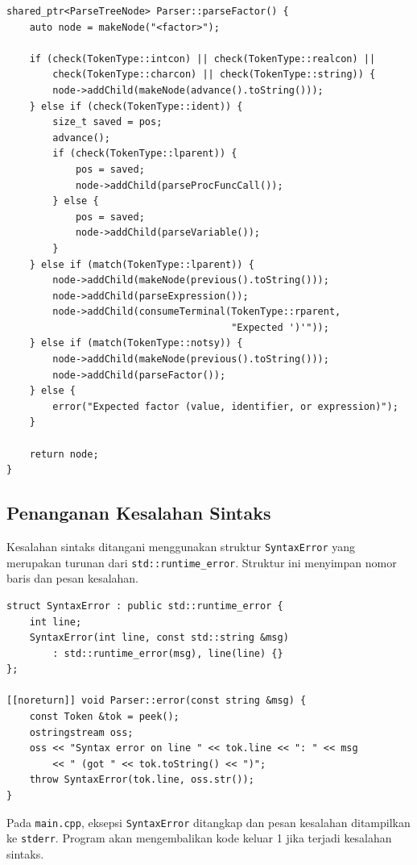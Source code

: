 \documentclass[12pt,a4paper]{article}
\begin{document}
\begin{lstlisting}[style=cpp, caption={Disambiguasi factor: variable vs function call}]
shared_ptr<ParseTreeNode> Parser::parseFactor() {
    auto node = makeNode("<factor>");

    if (check(TokenType::intcon) || check(TokenType::realcon) ||
        check(TokenType::charcon) || check(TokenType::string)) {
        node->addChild(makeNode(advance().toString()));
    } else if (check(TokenType::ident)) {
        size_t saved = pos;
        advance();
        if (check(TokenType::lparent)) {
            pos = saved;
            node->addChild(parseProcFuncCall());
        } else {
            pos = saved;
            node->addChild(parseVariable());
        }
    } else if (match(TokenType::lparent)) {
        node->addChild(makeNode(previous().toString()));
        node->addChild(parseExpression());
        node->addChild(consumeTerminal(TokenType::rparent,
                                       "Expected ')'"));
    } else if (match(TokenType::notsy)) {
        node->addChild(makeNode(previous().toString()));
        node->addChild(parseFactor());
    } else {
        error("Expected factor (value, identifier, or expression)");
    }

    return node;
}
\end{lstlisting}

\subsection{Penanganan Kesalahan Sintaks}

Kesalahan sintaks ditangani menggunakan struktur \texttt{SyntaxError} yang merupakan turunan dari \texttt{std::runtime\_error}. Struktur ini menyimpan nomor baris dan pesan kesalahan.

\begin{lstlisting}[style=cpp, caption={Struktur SyntaxError dan fungsi error}]
struct SyntaxError : public std::runtime_error {
    int line;
    SyntaxError(int line, const std::string &msg)
        : std::runtime_error(msg), line(line) {}
};

[[noreturn]] void Parser::error(const string &msg) {
    const Token &tok = peek();
    ostringstream oss;
    oss << "Syntax error on line " << tok.line << ": " << msg
        << " (got " << tok.toString() << ")";
    throw SyntaxError(tok.line, oss.str());
}
\end{lstlisting}

Pada \texttt{main.cpp}, eksepsi \texttt{SyntaxError} ditangkap dan pesan kesalahan ditampilkan ke \texttt{stderr}. Program akan mengembalikan kode keluar 1 jika terjadi kesalahan sintaks.
\end{document}
